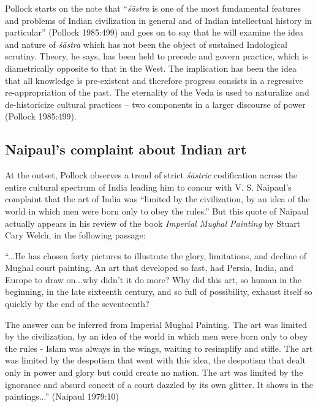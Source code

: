 Pollock starts on the note that ``{\sl śāstra} is one of the most fundamental features and problems of Indian civilization in general and of Indian intellectual history in particular'' (Pollock 1985:499) and goes on to say that he will examine the idea and nature of {\sl śāstra} which has not been the object of sustained Indological scrutiny. Theory, he says, has been held to precede and govern practice, which is diametrically opposite to that in the West. The implication has been the idea that all knowledge is pre-existent and therefore progress consists in a regressive re-appropriation of the past. The eternality of the Veda is used to naturalize and de-historicize cultural practices -- two components in a larger discourse of power (Pollock 1985:499).

\subsection{Naipaul's complaint about Indian art}\label{art12-sec3.2}

At the outset, Pollock observes a trend of strict {\sl śāstric} codiﬁcation across the entire cultural spectrum of India leading him to concur with V. S. Naipaul's complaint that the art of India was ``limited by the civilization, by an idea of the world in which men were born only to obey the rules.'' But this quote of Naipaul actually appears in his review of the book {\sl Imperial Mughal Painting} by Stuart Cary Welch, in the following passage:
\begin{myquote}
``...He has chosen forty pictures to illustrate the glory, limitations, and decline of Mughal court painting. An art that developed so fast, had Persia, India, and Europe to draw on...why didn't it do more? Why did this art, so human in the beginning, in the late sixteenth century, and so full of possibility, exhaust itself so quickly by the end of the seventeenth?

The answer can be inferred from Imperial Mughal Painting. The art was limited by the civilization, by an idea of the world in which men were born only to obey the rules - Islam was always in the wings, waiting to resimplify and stiﬂe. The art was limited by the despotism that went with this idea, the despotism that dealt only in power and glory but could create no nation. The art was limited by the ignorance and absurd conceit of a court dazzled by its own glitter. It shows in the paintings...'' (Naipaul 1979:10)
\end{myquote}

